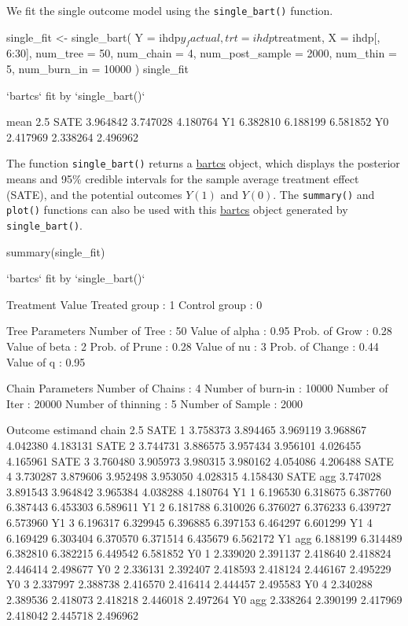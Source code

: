 We fit the single outcome model using the \verb|single_bart()| function.
\begin{example}
single_fit <- single_bart(
  Y               = ihdp$y_factual,
  trt             = ihdp$treatment,
  X               = ihdp[, 6:30],
  num_tree        = 50,
  num_chain       = 4,
  num_post_sample = 2000,
  num_thin        = 5,
  num_burn_in     = 10000
)
single_fit

`bartcs` fit by `single_bart()`

         mean     2.5%
SATE 3.964842 3.747028 4.180764
Y1   6.382810 6.188199 6.581852
Y0   2.417969 2.338264 2.496962
\end{example}
The function \verb|single_bart()| returns a \href{https://CRAN.R-project.org/package=bartcs}{bartcs} object, which displays the posterior means and 95\% credible intervals for the sample average treatment effect (SATE), and the potential outcomes $Y(1)$ and $Y(0)$. The \verb|summary()| and \verb|plot()| functions can also be used with this \href{https://CRAN.R-project.org/package=bartcs}{bartcs} object generated by \verb|single_bart()|.
\begin{example}
summary(single_fit)

`bartcs` fit by `single_bart()`

Treatment Value
  Treated group    :      1
  Control group    :      0

Tree Parameters
  Number of Tree   :     50		Value  of alpha    :   0.95
  Prob.  of Grow   :   0.28		Value  of beta     :      2
  Prob.  of Prune  :   0.28		Value  of nu       :      3
  Prob.  of Change :   0.44		Value  of q        :   0.95

Chain Parameters
  Number of Chains :      4		Number of burn-in  :  10000
  Number of Iter   :  20000		Number of thinning :      5
  Number of Sample :   2000

Outcome 
 estimand chain     2.5%
      SATE    1 3.758373 3.894465 3.969119 3.968867 4.042380 4.183131
      SATE    2 3.744731 3.886575 3.957434 3.956101 4.026455 4.165961
      SATE    3 3.760480 3.905973 3.980315 3.980162 4.054086 4.206488
      SATE    4 3.730287 3.879606 3.952498 3.953050 4.028315 4.158430
      SATE  agg 3.747028 3.891543 3.964842 3.965384 4.038288 4.180764
       Y1     1 6.196530 6.318675 6.387760 6.387443 6.453303 6.589611
       Y1     2 6.181788 6.310026 6.376027 6.376233 6.439727 6.573960
       Y1     3 6.196317 6.329945 6.396885 6.397153 6.464297 6.601299
       Y1     4 6.169429 6.303404 6.370570 6.371514 6.435679 6.562172
       Y1   agg 6.188199 6.314489 6.382810 6.382215 6.449542 6.581852
       Y0     1 2.339020 2.391137 2.418640 2.418824 2.446414 2.498677
       Y0     2 2.336131 2.392407 2.418593 2.418124 2.446167 2.495229
       Y0     3 2.337997 2.388738 2.416570 2.416414 2.444457 2.495583
       Y0     4 2.340288 2.389536 2.418073 2.418218 2.446018 2.497264
       Y0   agg 2.338264 2.390199 2.417969 2.418042 2.445718 2.496962
\end{example}
